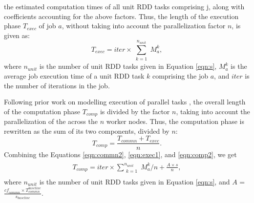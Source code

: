 \documentclass[conference]{IEEEtran}
\begin{document}
 the estimated computation times of all unit RDD tasks comprising j, along with coefficients accounting for the
 above factors.
 Thus, the length of the execution phase $\mathit{T_{\mathit{exec}}}$ of job $a$, without taking into account the parallelization factor $n$, is given as: \begin{equation}\label{eqn:exec1}
  \mathit{T_{\mathit{exec}}} = \mathit{iter} \times  \mathit{\sum_{\substack{k=1}}^{\mathit{n_{unit}}}
                                        M_{a}^{k}},
\end{equation}
   where  $\mathit{n_{unit}}$ is the number of unit RDD tasks given in Equation \ref{eqn:s}, $\mathit{M_a^k}$ is the average job execution
  time of a unit RDD task $k$ comprising the job $a$, and $\mathit{iter}$ is the number of iterations in the job.
\par Following prior work on modelling execution of parallel tasks \cite{Verma:2011:AAR:1998582.1998637}, the overall length of the computation phase $\mathit{T_{\mathit{comp}}}$ is divided by the factor $n$, taking into account
  the parallelization of the  across the $n$ worker nodes. Thus, the computation
  phase is rewritten as the sum of its two components, divided by $n$:
  \begin{equation}\label{eqn:comp2}
  \mathit{T_{\mathit{comp}}} = \frac{\mathit{T_{\mathit{commn}}} + \mathit{T_{\mathit{exec}}}}{n}.
  \end{equation}
Combining the Equations \ref{eqn:commn2}, \ref{eqn:exec1}, and \ref{eqn:comp2}, we get
\begin{align}\label{eqn:comp3}
\begin{split}
\mathit{T_{\mathit{comp}} = \mathit{iter} \times   \sum_{\substack{k=1}}^{\mathit{n_{unit}}} M_{a}^{k} / n}  + \frac{A \times s}{n},
\end{split}
\end{align} where $\mathit{n_{unit}}$ is the number of unit RDD tasks given in Equation \ref{eqn:s},
 and $A$ = $\mathit{\frac{\mathit{cf}_{\mathit{commn}} \times T_{\mathit{commn}}^{\mathit{baseline}}}{\mathit{s_{\mathit{baseline}}}}}$.
\end{document}
